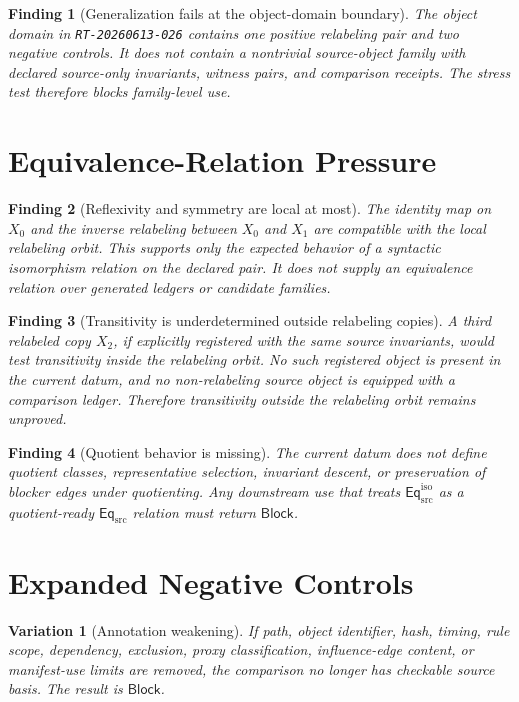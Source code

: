 \documentclass[11pt]{article}
\newcommand{\EqSrc}{\mathsf{Eq}_{\mathrm{src}}}
\newcommand{\EqIso}{\mathsf{Eq}_{\mathrm{src}}^{\mathrm{iso}}}
\newcommand{\Block}{\mathsf{Block}}
\newtheorem{finding}{Finding}
\newtheorem{variant}{Variation}
\begin{document}
\begin{finding}[Generalization fails at the object-domain boundary]
The object domain in \texttt{RT-20260613-026} contains one positive
relabeling pair and two negative controls. It does not contain a
nontrivial source-object family with declared source-only invariants,
witness pairs, and comparison receipts. The stress test therefore blocks
family-level use.
\end{finding}

\section{Equivalence-Relation Pressure}

\begin{finding}[Reflexivity and symmetry are local at most]
The identity map on \(X_{0}\) and the inverse relabeling between
\(X_{0}\) and \(X_{1}\) are compatible with the local relabeling orbit.
This supports only the expected behavior of a syntactic isomorphism
relation on the declared pair. It does not supply an equivalence relation
over generated ledgers or candidate families.
\end{finding}

\begin{finding}[Transitivity is underdetermined outside relabeling copies]
A third relabeled copy \(X_{2}\), if explicitly registered with the same
source invariants, would test transitivity inside the relabeling orbit.
No such registered object is present in the current datum, and no
non-relabeling source object is equipped with a comparison ledger.
Therefore transitivity outside the relabeling orbit remains unproved.
\end{finding}

\begin{finding}[Quotient behavior is missing]
The current datum does not define quotient classes, representative
selection, invariant descent, or preservation of blocker edges under
quotienting. Any downstream use that treats \(\EqIso\) as a quotient-ready
\(\EqSrc\) relation must return \(\Block\).
\end{finding}

\section{Expanded Negative Controls}

\begin{variant}[Annotation weakening]
If path, object identifier, hash, timing, rule scope, dependency,
exclusion, proxy classification, influence-edge content, or manifest-use
limits are removed, the comparison no longer has checkable source basis.
The result is \(\Block\).
\end{variant}
\end{document}
